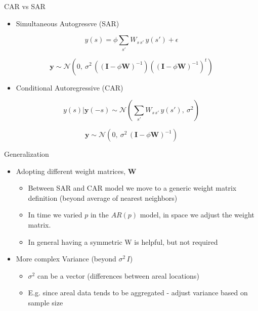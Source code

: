 \documentclass[11pt,ignorenonframetext,]{beamer}
\providecommand{\tightlist}{%
  \setlength{\itemsep}{0pt}\setlength{\parskip}{0pt}}
\begin{document}
\begin{frame}[t]{CAR vs SAR}
\protect\hypertarget{car-vs-sar}{}

\begin{itemize}
\tightlist
\item
  Simultaneous Autogressve (SAR)
\end{itemize}

\[ y(s) = \phi \sum_{s'} W_{s\,s'} \, y(s') + \epsilon \]

\[ \symbf{y} \sim \mathcal{N}(0,~\sigma^2 \, ((\symbf{I}-\phi \symbf{W})^{-1}) ((\symbf{I}-\phi \symbf{W})^{-1})^t )\]

\begin{itemize}
\tightlist
\item
  Conditional Autoregressive (CAR)
\end{itemize}

\[ y(s)|\symbf{y}(-s) \sim \mathcal{N}\left(\sum_{s'} W_{s\,s'} \, y(s'),~ \sigma^2 \right) \]

\[ \symbf{y} \sim \mathcal{N}(0,~\sigma^2 \, (\symbf{I}-\phi \symbf{W})^{-1})\]

\end{frame}

\begin{frame}[t]{Generalization}
\protect\hypertarget{generalization}{}

\begin{itemize}
\item
  Adopting different weight matrices, \(\symbf{W}\)

  \begin{itemize}
  \item
    Between SAR and CAR model we move to a generic weight matrix
    definition (beyond average of nearest neighbors)
  \item
    In time we varied \(p\) in the \(AR(p)\) model, in space we adjust
    the weight matrix.
  \item
    In general having a symmetric W is helpful, but not required
  \end{itemize}
\end{itemize}

\pause

\begin{itemize}
\item
  More complex Variance (beyond \(\sigma^2 \, I\))

  \begin{itemize}
  \item
    \(\sigma^2\) can be a vector (differences between areal locations)
  \item
    E.g. since areal data tends to be aggregated - adjust variance based
    on sample size
  \end{itemize}
\end{itemize}

\end{frame}
\end{document}
